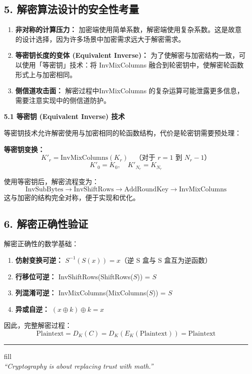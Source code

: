 \documentclass[12pt, a4paper]{article}
\begin{document}
\subsection{5. 解密算法设计的安全性考量}

\begin{enumerate}
    \item \textbf{非对称的计算压力：} 加密端使用简单系数，解密端使用复杂系数。这是故意的设计选择，因为许多场景中加密需求远大于解密需求。
    
    \item \textbf{等密钥长度的变体 (Equivalent Inverse)：} 为了使解密与加密结构一致，可以使用「等密钥」技术：将 InvMixColumns 融合到轮密钥中，使解密轮函数形式上与加密相同。
    
    \item \textbf{侧信道攻击面：} 解密过程中InvMixColumns 的复杂运算可能泄露更多信息，需要注意实现中的侧信道防护。
\end{enumerate}

\textbf{5.1 等密钥 (Equivalent Inverse) 技术}

等密钥技术允许解密使用与加密相同的轮函数结构，代价是轮密钥需要预处理：

\begin{tcolorbox}[mathbox]
\textbf{等密钥变换：}
$$
K'_r = \text{InvMixColumns}(K_r) \quad \text{（对于 } r = 1 \text{ 到 } N_r-1\text{）}
$$
$$
K'_0 = K_0, \quad K'_{N_r} = K_{N_r}
$$
\end{tcolorbox}

使用等密钥后，解密流程变为：
$$
\text{InvSubBytes} \rightarrow \text{InvShiftRows} \rightarrow \text{AddRoundKey} \rightarrow \text{InvMixColumns}
$$
这与加密的结构完全对称，便于实现和优化。

\subsection{6. 解密正确性验证}

解密正确性的数学基础：

\begin{enumerate}
    \item \textbf{仿射变换可逆：} $S^{-1}(S(x)) = x$（逆 S 盒与 S 盒互为逆函数）
    \item \textbf{行移位可逆：} InvShiftRows(ShiftRows($S$)) = $S$
    \item \textbf{列混淆可逆：} InvMixColumns(MixColumns($S$)) = $S$
    \item \textbf{异或自逆：} $(x \oplus k) \oplus k = x$
\end{enumerate}

因此，完整解密过程：
$$
\text{Plaintext} = D_K(C) = D_K(E_K(\text{Plaintext})) = \text{Plaintext}
$$

\vspace{1cm}
\begin{center}
    \color{gray} \hrule fill \\ \vspace{0.2cm}
    \textit{“Cryptography is about replacing trust with math.”}
\end{center}
\end{document}
